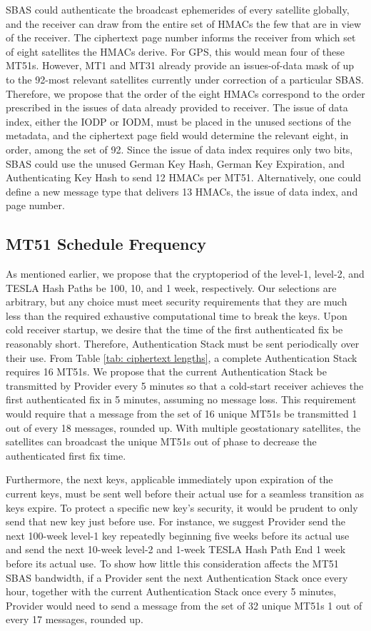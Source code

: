 \documentclass[letterpaper,times]{IONconf/IONconf}
\begin{document}
SBAS could authenticate the broadcast ephemerides of every satellite globally, and the receiver can draw from the entire set of HMACs the few that are in view of the receiver.
The ciphertext page number informs the receiver from which set of eight satellites the HMACs derive.
For GPS, this would mean four of these MT51s.
However, MT1 and MT31 already provide an issues-of-data mask of up to the 92-most relevant satellites currently under correction of a particular SBAS.
Therefore, we propose that the order of the eight HMACs correspond to the order prescribed in the issues of data already provided to receiver.
The issue of data index, either the IODP or IODM, must be placed in the unused sections of the metadata, and the ciphertext page field would determine the relevant eight, in order, among the set of 92.
Since the issue of data index requires only two bits, SBAS could use the unused German Key Hash, German Key Expiration, and Authenticating Key Hash to send 12 HMACs per MT51.
Alternatively, one could define a new message type that delivers 13 HMACs, the issue of data index, and page number.

\subsection{MT51 Schedule Frequency} \label{sec: MT51 Freq}

As mentioned earlier, we propose that the cryptoperiod of the level-1, level-2, and TESLA Hash Paths be 100, 10, and 1 week, respectively.
Our selections are arbitrary, but any choice must meet security requirements that they are much less than the required exhaustive computational time to break the keys.
Upon cold receiver startup, we desire that the time of the first authenticated fix be reasonably short.
Therefore, Authentication Stack must be sent periodically over their use.
From Table \ref{tab: ciphertext lengths}, a complete Authentication Stack requires 16 MT51s. 
We propose that the current Authentication Stack be transmitted by Provider every 5 minutes so that a cold-start receiver achieves the first authenticated fix in 5 minutes, assuming no message loss.
This requirement would require that a message from the set of 16 unique MT51s be transmitted 1 out of every 18 messages, rounded up.
With multiple geostationary satellites, the satellites can broadcast the unique MT51s out of phase to decrease the authenticated first fix time.

Furthermore, the next keys, applicable immediately upon expiration of the current keys, must be sent well before their actual use for a seamless transition as keys expire.
To protect a specific new key's security, it would be prudent to only send that new key just before use.
For instance, we suggest Provider send the next 100-week level-1 key repeatedly beginning five weeks before its actual use and send the next 10-week level-2 and 1-week TESLA Hash Path End 1 week before its actual use.
To show how little this consideration affects the MT51 SBAS bandwidth, if a Provider sent the next Authentication Stack once every hour, together with the current Authentication Stack once every 5 minutes, Provider would need to send a message from the set of 32 unique MT51s 1 out of every 17 messages, rounded up.
\end{document}
